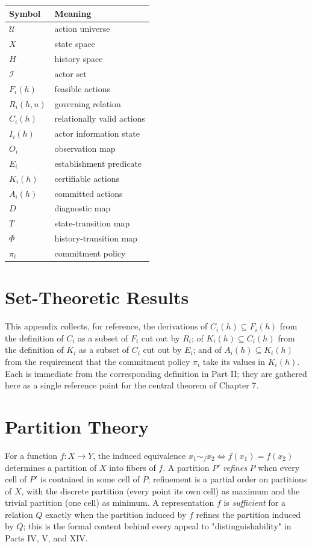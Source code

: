 \documentclass[11pt]{report}
\theoremstyle{definition}
\theoremstyle{plain}
\newcommand{\Uni}{\mathcal{U}}
\newcommand{\Ii}{\mathcal{I}}
\begin{document}
\begin{center}
\begin{tabular}{@{}ll@{}}
\toprule
Symbol & Meaning \\
\midrule
$\Uni$ & action universe \\
$X$ & state space \\
$H$ & history space \\
$\Ii$ & actor set \\
$F_i(h)$ & feasible actions \\
$R_i(h,u)$ & governing relation \\
$C_i(h)$ & relationally valid actions \\
$I_i(h)$ & actor information state \\
$O_i$ & observation map \\
$E_i$ & establishment predicate \\
$K_i(h)$ & certifiable actions \\
$A_i(h)$ & committed actions \\
$D$ & diagnostic map \\
$T$ & state-transition map \\
$\Phi$ & history-transition map \\
$\pi_i$ & commitment policy \\
\bottomrule
\end{tabular}
\end{center}

\chapter{Set-Theoretic Results}

This appendix collects, for reference, the derivations of $C_i(h) \subseteq F_i(h)$ from the definition of $C_i$ as a subset of $F_i$ cut out by $R_i$; of $K_i(h) \subseteq C_i(h)$ from the definition of $K_i$ as a subset of $C_i$ cut out by $E_i$; and of $A_i(h) \subseteq K_i(h)$ from the requirement that the commitment policy $\pi_i$ take its values in $K_i(h)$. Each is immediate from the corresponding definition in Part II; they are gathered here as a single reference point for the central theorem of Chapter 7.

\chapter{Partition Theory}

For a function $f: X \to Y$, the induced equivalence $x_1 \sim_f x_2 \iff f(x_1) = f(x_2)$ determines a partition of $X$ into fibers of $f$. A partition $P'$ \emph{refines} $P$ when every cell of $P'$ is contained in some cell of $P$; refinement is a partial order on partitions of $X$, with the discrete partition (every point its own cell) as maximum and the trivial partition (one cell) as minimum. A representation $f$ is \emph{sufficient} for a relation $Q$ exactly when the partition induced by $f$ refines the partition induced by $Q$; this is the formal content behind every appeal to "distinguishability" in Parts IV, V, and XIV.
\end{document}
